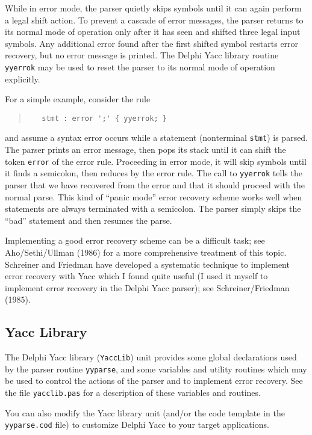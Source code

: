 \documentclass{article}
\begin{document}
While in error mode, the parser quietly skips symbols until it can again
perform a legal shift action. To prevent a cascade of error messages, the
parser returns to its normal mode of operation only after it has seen
and shifted three legal input symbols. Any additional error found after
the first shifted symbol restarts error recovery, but no error message
is printed. The Delphi Yacc library routine \verb"yyerrok" may be used to reset
the parser to its normal mode of operation explicitly.

For a simple example, consider the rule
\begin{quote}\begin{verbatim}
   stmt : error ';' { yyerrok; }
\end{verbatim}\end{quote}
and assume a syntax error occurs while a statement (nonterminal \verb"stmt")
is parsed. The parser prints an error message, then pops its stack until it
can shift the token \verb"error" of the error rule. Proceeding in error mode,
it will skip symbols until it finds a semicolon, then reduces by the error
rule. The call to \verb"yyerrok" tells the parser that we have recovered from
the error and that it should proceed with the normal parse. This kind of
``panic mode'' error recovery scheme works well when statements are always
terminated with a semicolon. The parser simply skips the ``bad'' statement
and then resumes the parse.

Implementing a good error recovery scheme can be a difficult task; see
Aho/Sethi/Ullman (1986) for a more comprehensive treatment of this topic.
Schreiner and Friedman have developed a systematic technique to implement
error recovery with Yacc which I found quite useful (I used it myself
to implement error recovery in the Delphi Yacc parser); see Schreiner/Friedman
(1985).

\subsection{Yacc Library}

The Delphi Yacc library (\verb"YaccLib") unit provides some global declarations
used by the parser routine \verb"yyparse", and some variables and utility
routines which may be used to control the actions of the parser and to
implement error recovery. See the file \verb"yacclib.pas" for a description
of these variables and routines.

You can also modify the Yacc library unit (and/or the code template in the
\verb"yyparse.cod" file) to customize Delphi Yacc to your target applications.
\end{document}

